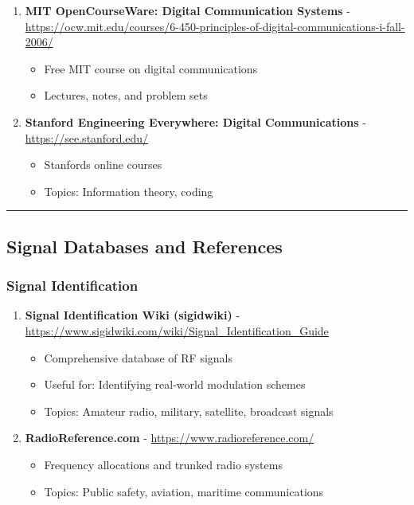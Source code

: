 \begin{enumerate}
\def\labelenumi{\arabic{enumi}.}
\setcounter{enumi}{40}
\tightlist
\item
  \textbf{MIT OpenCourseWare: Digital Communication Systems} - \url{https://ocw.mit.edu/courses/6-450-principles-of-digital-communications-i-fall-2006/}

  \begin{itemize}
  \tightlist
  \item
    Free MIT course on digital communications
  \item
    Lectures, notes, and problem sets
  \end{itemize}
\item
  \textbf{Stanford Engineering Everywhere: Digital Communications} - \url{https://see.stanford.edu/}

  \begin{itemize}
  \tightlist
  \item
    Stanford\textquotesingle s online courses
  \item
    Topics: Information theory, coding
  \end{itemize}
\end{enumerate}

\begin{center}\rule{0.5\linewidth}{0.5pt}\end{center}

\subsection{\texorpdfstring{ Signal Databases and
References}{ Signal Databases and References}}\label{signal-databases-and-references}

\subsubsection{Signal Identification}\label{signal-identification}

\begin{enumerate}
\def\labelenumi{\arabic{enumi}.}
\setcounter{enumi}{42}
\tightlist
\item
  \textbf{Signal Identification Wiki (sigidwiki)} - \url{https://www.sigidwiki.com/wiki/Signal_Identification_Guide}

  \begin{itemize}
  \tightlist
  \item
    Comprehensive database of RF signals
  \item
    Useful for: Identifying real-world modulation schemes
  \item
    Topics: Amateur radio, military, satellite, broadcast signals
  \end{itemize}
\item
  \textbf{RadioReference.com} - \url{https://www.radioreference.com/}

  \begin{itemize}
  \tightlist
  \item
    Frequency allocations and trunked radio systems
  \item
    Topics: Public safety, aviation, maritime communications
  \end{itemize}
\end{enumerate}

